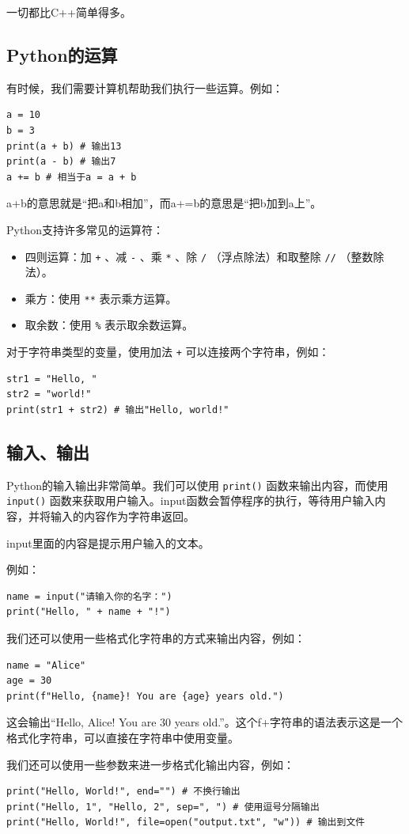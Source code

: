 一切都比C++简单得多。

\subsection{Python的运算}

有时候，我们需要计算机帮助我们执行一些运算。例如：
\begin{verbatim}
a = 10
b = 3
print(a + b) # 输出13
print(a - b) # 输出7
a += b # 相当于a = a + b
\end{verbatim}
a+b的意思就是“把a和b相加”，而a+=b的意思是“把b加到a上”。

Python支持许多常见的运算符：
\begin{itemize}
  \item
    四则运算：加 \texttt{+} 、减 \texttt{-} 、乘 \texttt{*} 、除 \texttt{/} （浮点除法）和取整除 \texttt{//} （整数除法）。
  \item 乘方：使用 \texttt{**} 表示乘方运算。
  \item 取余数：使用 \texttt{\%} 表示取余数运算。
\end{itemize}

对于字符串类型的变量，使用加法 \texttt{+} 可以连接两个字符串，例如：
\begin{verbatim}
str1 = "Hello, "
str2 = "world!"
print(str1 + str2) # 输出"Hello, world!"
\end{verbatim}

\subsection{输入、输出}
Python的输入输出非常简单。我们可以使用 \texttt{print()} 函数来输出内容，而使用 \texttt{input()} 函数来获取用户输入。input函数会暂停程序的执行，等待用户输入内容，并将输入的内容作为字符串返回。

input里面的内容是提示用户输入的文本。

例如：
\begin{verbatim}
name = input("请输入你的名字：")
print("Hello, " + name + "!")
\end{verbatim}

我们还可以使用一些格式化字符串的方式来输出内容，例如：
\begin{verbatim}
name = "Alice"
age = 30
print(f"Hello, {name}! You are {age} years old.")
\end{verbatim}
这会输出“Hello, Alice! You are 30 years old.”。这个f+字符串的语法表示这是一个格式化字符串，可以直接在字符串中使用变量。

我们还可以使用一些参数来进一步格式化输出内容，例如：
\begin{verbatim}
print("Hello, World!", end="") # 不换行输出
print("Hello, 1", "Hello, 2", sep=", ") # 使用逗号分隔输出
print("Hello, World!", file=open("output.txt", "w")) # 输出到文件
\end{verbatim}

